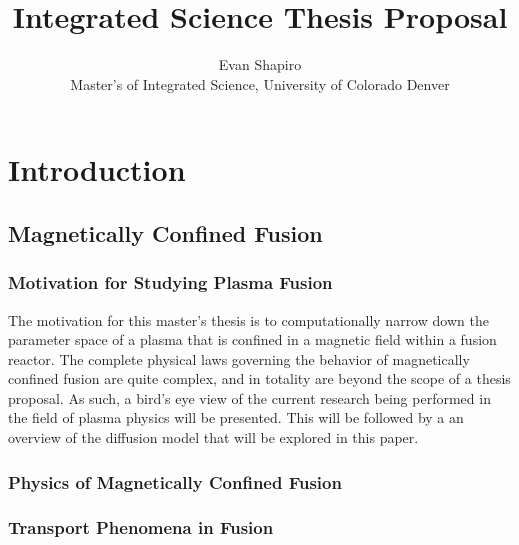 \documentclass{article}
\title{Integrated Science Thesis Proposal}
\author{Evan Shapiro \\ Master's of Integrated Science, University of Colorado Denver}
\begin{document}
\maketitle
\tableofcontents
\section{Introduction}
\subsection{Magnetically Confined Fusion}
\subsubsection{Motivation for Studying Plasma Fusion}
The motivation for this master's thesis is to computationally narrow down the parameter space of a plasma that is confined in a magnetic field within a fusion reactor. The complete physical laws governing the behavior of magnetically confined fusion are quite complex, and in totality are beyond the scope of a thesis proposal. As such, a bird's eye view of the current research being performed in the field of plasma physics will be presented. This will be followed by a an overview of the diffusion model that will be explored in this paper.
\subsubsection{Physics of Magnetically Confined Fusion}
\subsubsection{Transport Phenomena in Fusion}
\
\end{document}
